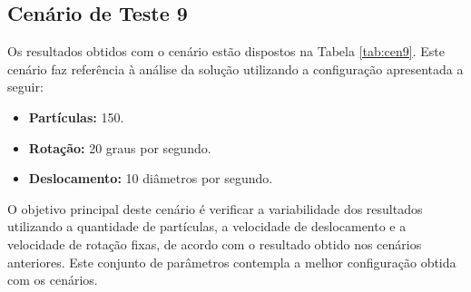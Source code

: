 \subsection{Cenário de Teste 9}
\label{sub:cen9}

Os resultados obtidos com o cenário estão dispostos na Tabela \ref{tab:cen9}. Este cenário faz referência à análise da solução
utilizando a configuração apresentada a seguir:

\begin{itemize}
  \item \textbf{Partículas:} 150.
  \item \textbf{Rotação:} 20 graus por segundo.
  \item \textbf{Deslocamento:} 10 diâmetros por segundo.
\end{itemize}

O objetivo principal deste cenário é verificar a variabilidade dos resultados utilizando a quantidade de partículas, a velocidade de
deslocamento e a velocidade de rotação fixas, de acordo com o resultado obtido nos cenários anteriores. Este conjunto de parâmetros
contempla a melhor configuração obtida com os cenários.

